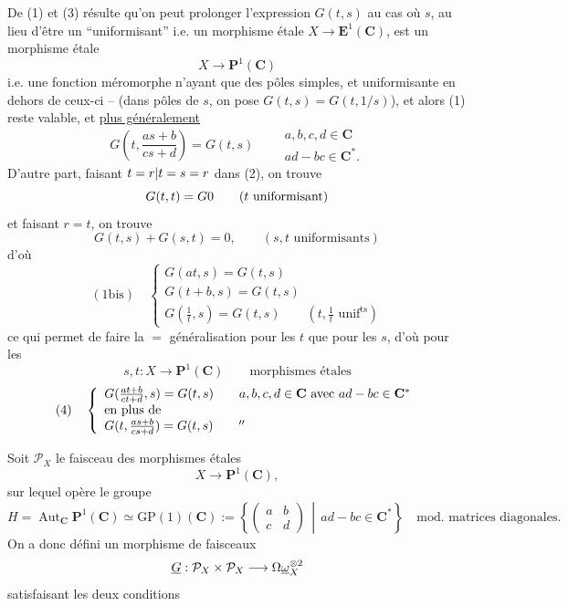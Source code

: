 De (1)  et (3) résulte qu'on peut prolonger l'expression $G(t,s)$ au cas où $s$, au lieu d'être un ``uniformisant'' i.e. un morphisme étale $X\longrightarrow\mathbf E^1(\mathbf C)$, est un morphisme étale
\[
X\longrightarrow\mathbf P^1(\mathbf C)
\]
i.e. une fonction méromorphe n'ayant que des pôles simples, et uniformisante en dehors de ceux-ci -- (dans  pôles de $s$, on pose $G(t,s)=G(t,1/s)$), et alors  (1)  reste valable, et \uline{plus généralement}
\[
G\left(t,\frac{as+b}{cs+d}\right)=G(t,s)\qquad
\begin{gathered}a,b,c,d\in\mathbf C\\ad-bc\in\mathbf C^*.\end{gathered}
\]
D'autre part, faisant ${t=r|t=s=r}$ dans (2), on trouve
\[
G(t,t)={{G}}0\qquad(t\text{ uniformisant})
\]
et faisant $r=t$, on trouve
\[
G(t,s)+G(s,t)=0,\qquad(s,t\text{ uniformisants})
\]
d'où
\[
(1\mathrm{bis})\quad\left\{\begin{array}{l}
G(at,s)=G(t,s)\\
G(t+b,s)=G(t,s)\\
G(\frac1t,s)=G(t,s)\qquad(t,\frac1t\text{ unif}^{\mathrm{ts}})
\end{array}\right.
\]
ce qui permet de faire la $=$ généralisation pour les $t$ que pour les $s$, d'où pour les
\[
s,t:X\longrightarrow\mathbf P^1(\mathbf C)\qquad\text{morphismes étales}
\]
\[
(4)\quad\left\{\begin{array}{l}
G(\frac{at+b}{ct+d},s)=G(t,s)\qquad a,b,c,d\in\mathbf C\text{ avec }ad-bc\in\mathbf C^*\\
\text{en plus de}\\
G(t,\frac{as+b}{cs+d})=G(t,s)\qquad{''}
\end{array}\right.
\]

Soit $\mathcal P_X$ le faisceau des morphismes  étales
\[
X\longrightarrow\mathbf P^1(\mathbf C),
\]
sur lequel opère le groupe
\[
H=\operatorname{Aut}_{\mathbf C}\mathbf P^1(\mathbf C)\simeq\mathrm{GP}(1)(\mathbf C):=\left\{\left(\begin{matrix}a&b\\c&d\end{matrix}\right)\,\middle|\,ad-bc\in\mathbf C^*\right\}\quad\text{mod. matrices diagonales}.
\]
On a donc défini un morphisme de faisceaux
\[
\underline G:\mathcal P_X\times\mathcal P_X\longrightarrow{{\Omega}}\underline\omega_X^{\otimes2}
\]
satisfaisant les deux conditions

